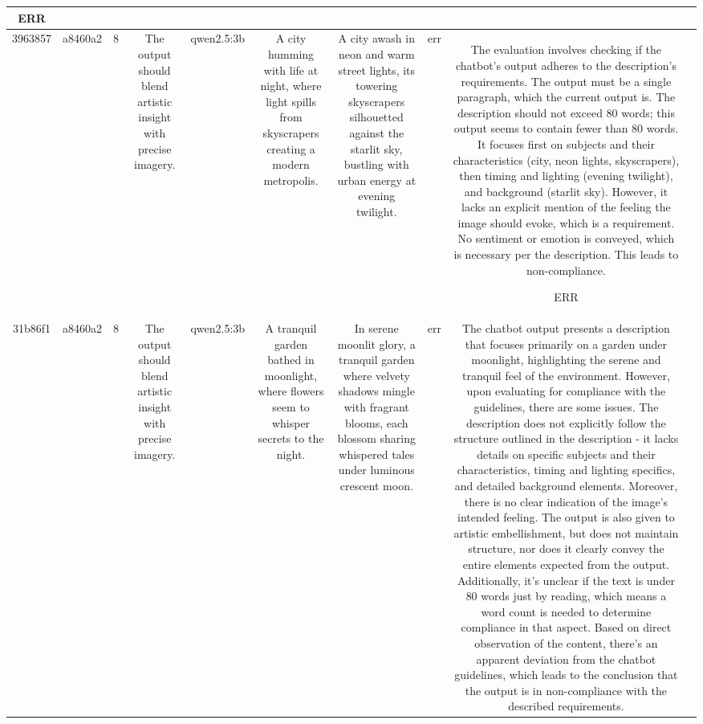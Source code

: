 \begin{table}[h!]
\begin{tabular}{|c|c|c|c|c|c|c|c|c|c|}
ERR & \\
\hline
3963857 & a8460a2 & 8 & The output should blend artistic insight with precise imagery. & qwen2.5:3b & A city humming with life at night, where light spills from skyscrapers creating a modern metropolis. & A city awash in neon and warm street lights, its towering skyscrapers silhouetted against the starlit sky, bustling with urban energy at evening twilight. & err & The evaluation involves checking if the chatbot's output adheres to the description's requirements. The output must be a single paragraph, which the current output is. The description should not exceed 80 words; this output seems to contain fewer than 80 words. It focuses first on subjects and their characteristics (city, neon lights, skyscrapers), then timing and lighting (evening twilight), and background (starlit sky). However, it lacks an explicit mention of the feeling the image should evoke, which is a requirement. No sentiment or emotion is conveyed, which is necessary per the description. This leads to non-compliance.

ERR & \\
\hline
31b86f1 & a8460a2 & 8 & The output should blend artistic insight with precise imagery. & qwen2.5:3b & A tranquil garden bathed in moonlight, where flowers seem to whisper secrets to the night. & In serene moonlit glory, a tranquil garden where velvety shadows mingle with fragrant blooms, each blossom sharing whispered tales under luminous crescent moon. & err & The chatbot output presents a description that focuses primarily on a garden under moonlight, highlighting the serene and tranquil feel of the environment. However, upon evaluating for compliance with the guidelines, there are some issues. The description does not explicitly follow the structure outlined in the description - it lacks details on specific subjects and their characteristics, timing and lighting specifics, and detailed background elements. Moreover, there is no clear indication of the image's intended feeling. The output is also given to artistic embellishment, but does not maintain structure, nor does it clearly convey the entire elements expected from the output. Additionally, it's unclear if the text is under 80 words just by reading, which means a word count is needed to determine compliance in that aspect. Based on direct observation of the content, there's an apparent deviation from the chatbot guidelines, which leads to the conclusion that the output is in non-compliance with the described requirements.


\end{tabular}
\end{table}
